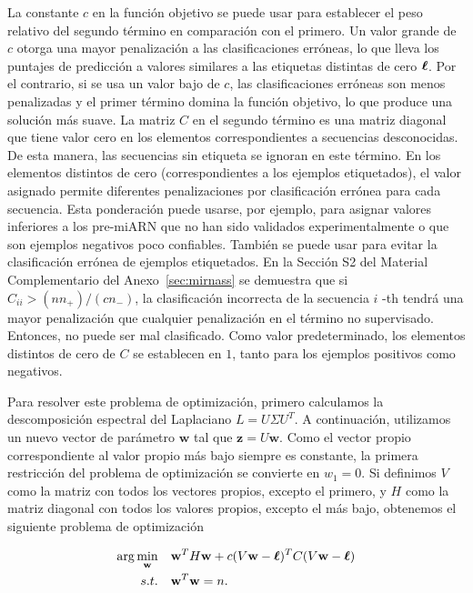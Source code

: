 La constante $ c $ en la función objetivo se puede usar para establecer el peso relativo del segundo término en comparación con el primero. Un valor grande
de $ c $ otorga una mayor penalización a las clasificaciones erróneas, lo que lleva los puntajes de predicción a valores similares a las etiquetas distintas
de cero $ \boldsymbol\ell $. Por el contrario, si se usa un valor bajo de $ c $, las clasificaciones erróneas son menos penalizadas y el primer término domina la
función objetivo, lo que produce una solución más suave. La matriz $C$ en el segundo término es una matriz diagonal que tiene valor cero en los elementos
correspondientes a secuencias desconocidas. De esta manera, las secuencias sin etiqueta se ignoran en este término. En los elementos distintos de cero
(correspondientes a los ejemplos etiquetados), el valor asignado permite diferentes penalizaciones por clasificación errónea para cada secuencia. Esta
ponderación puede usarse, por ejemplo, para asignar valores inferiores a los pre-miARN que no han sido validados experimentalmente o que son ejemplos
negativos poco confiables. También se puede usar para evitar la clasificación errónea de ejemplos etiquetados. En la Sección S2 del Material Complementario
del Anexo~\ref{sec:mirnass} se demuestra que si $ C_ {ii}> (n n _ {+}) / (c n _ {-}) $, la clasificación incorrecta de la secuencia $ i $ -th tendrá una mayor penalización
que cualquier penalización en el término no supervisado. Entonces, no puede ser mal clasificado. Como valor predeterminado, los elementos distintos de cero
de $ C $ se establecen en $ 1 $, tanto para los ejemplos positivos como negativos.

Para resolver este problema de optimización, primero calculamos la descomposición espectral del Laplaciano $ L = U \Sigma U ^ T $. A continuación,
utilizamos un nuevo vector de parámetro $ \mathbf {w} $ tal que $ \mathbf {z} = U \mathbf {w} $. Como el vector propio correspondiente al valor propio más
bajo siempre es constante, la primera restricción del problema de optimización se convierte en $ w_ {1} = 0 $. Si definimos $ V $ como la matriz con todos
los vectores propios, excepto el primero, y $ H $ como la matriz diagonal con todos los valores propios, excepto el más bajo, obtenemos el siguiente problema
de optimización

\begin{equation}
	\begin{split}
		\arg\min_{\mathbf{w}} & \quad \mathbf{w}^T H \mathbf{w} + c (V \mathbf{w} - \boldsymbol\ell)^T C (V \mathbf{w} - \boldsymbol\ell) \\
		s.t. & \quad \mathbf{w}^T \mathbf{w} = n.
	\end{split}
\end{equation}

